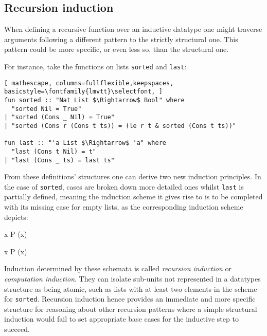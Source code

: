 \label{sec:rec-ind}

\subsection{Recursion induction}

When defining a recursive function over an inductive datatype one might traverse arguments following a different pattern to the strictly structural one.
%
This pattern could be more specific, or even less so, than the structural one.

For instance, take the functions on lists \texttt{\selectfont sorted} and \texttt{\selectfont last}:

\begin{lstlisting}[ mathescape, columns=fullflexible,keepspaces, basicstyle=\fontfamily{lmvtt}\selectfont, ]
fun sorted :: "Nat List $\Rightarrow$ Bool" where
  "sorted Nil = True"
| "sorted (Cons _ Nil) = True"
| "sorted (Cons r (Cons t ts)) = (le r t & sorted (Cons t ts))"

fun last :: "'a List $\Rightarrow$ 'a" where
  "last (Cons t Nil) = t"
| "last (Cons _ ts) = last ts"
\end{lstlisting}

\noindent From these definitions' structures one can derive two new induction principles.
%
In the case of \texttt{\selectfont sorted}, cases are broken down more detailed ones whilst \texttt{\selectfont last} is partially defined, meaning the induction scheme it gives rise to is to be completed with its missing case for empty lists, as the corresponding induction scheme depicts:

  {\forall x \; P (x)}

  {\forall x \; P (x)}

Induction determined by these schemata is called \emph{recursion induction} or \emph{computation induction}.
%
They can isolate sub-units not represented in a datatypes structure as being atomic, such as lists with at least two elements in the scheme for \texttt{\selectfont sorted}.
%
Recursion induction hence provides an immediate and more specific structure for reasoning about other recursion patterns where a simple structural induction would fail to set appropriate base cases for the inductive step to succeed.

